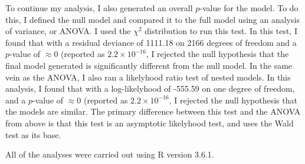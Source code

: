 \documentclass[letter,12pt]{article}
\begin{document}
	To continue my analysis, I also generated an overall $p$-value for the model. To do this, I defined the null model and compared it to the full model using an analysis of variance, or ANOVA. I used the $\chi^{2}$ distribution to run this test. In this test, I found that with a residual deviance of 1111.18 on 2166 degrees of freedom and a $p$-value of $\approx 0$ (reported as $2.2 \times 10^{-16}$, I rejected the null hypothesis that the final model generated is significantly different from the null model. In the same vein as the ANOVA, I also ran a likelyhood ratio test of nested models. In this analysis, I found that with a log-likelyhood of -555.59 on one degree of freedom, and a $p$-value of $\approx 0$ (reported as $2.2 \times 10^{-16}$, I rejected the null hypothesis that the models are similar. The primary difference between this test and the ANOVA from above is that this test is an asymptotic likelyhood test, and uses the Wald test as its base.\par
	All of the analyses were carried out using R version 3.6.1.\par
\end{document}
